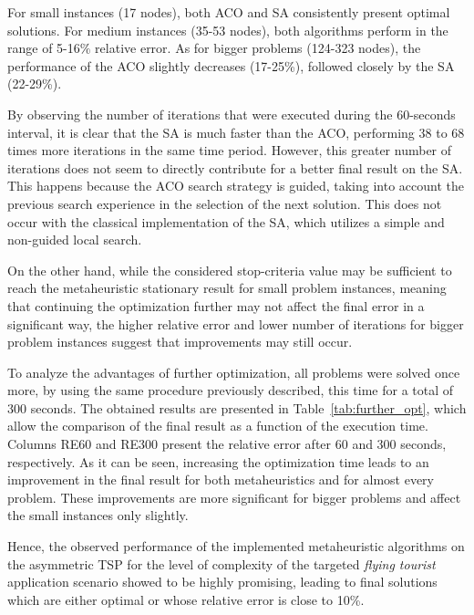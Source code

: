 \documentclass[onecolumn]{elsarticle}
\begin{document}
For small instances (17 nodes), both ACO and SA consistently present optimal solutions. For medium instances (35-53 nodes), both algorithms perform in the range of 5-16$\%$ relative error. As for bigger problems (124-323 nodes), the performance of the ACO slightly decreases (17-25\%), followed closely by the SA (22-29\%). 

By observing the number of iterations that were executed during the 60-seconds interval, it is clear that the SA is much faster than the ACO, performing 38 to 68 times more iterations in the same time period. However, this greater number of iterations does not seem to directly contribute for a better final result on the SA. This happens because the ACO search strategy is guided, taking into account the previous search experience in the selection of the next solution. This does not occur with the classical implementation of the SA, which utilizes a simple and non-guided local search.

On the other hand, while the considered stop-criteria value may be sufficient to reach the metaheuristic stationary result for small problem instances, meaning that continuing the optimization further may not affect the final error in a significant way, the higher relative error and lower number of iterations for bigger problem instances suggest that improvements may still occur.

To analyze the advantages of further optimization, all problems were solved once more, by using the same procedure previously described, this time for a total of 300 seconds. The obtained results are presented in Table~\ref{tab:further_opt}, which allow the comparison of the final result as a function of the execution time. Columns RE60 and RE300 present the relative error after 60 and 300 seconds, respectively. As it can be seen, increasing the optimization time leads to an improvement in the final result for both metaheuristics and for almost every problem. These improvements are more significant for bigger problems and affect the small instances only slightly.

Hence, the observed performance of the implemented metaheuristic algorithms on the asymmetric TSP for the level of complexity of the targeted \textit{flying tourist} application scenario showed to be highly promising, leading to final solutions which are either optimal or whose relative error is close to 10\%. 
\end{document}
